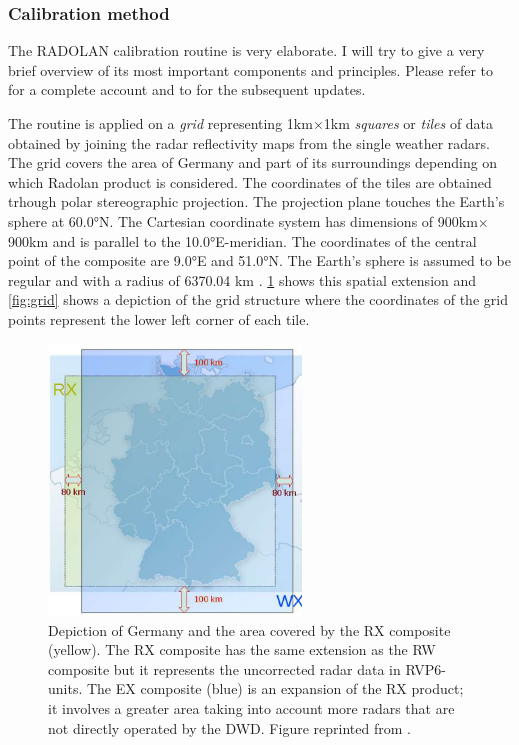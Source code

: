 \subsubsection{Calibration method}
The RADOLAN calibration routine is very elaborate. I will try to give a very brief overview of its most important components and principles. Please refer to \citet{Weigl2004ProjektOmbrometer} for a complete account and to \citet{Weigl2021RADOLANRoutine} for the subsequent updates.

The routine is applied on a \textit{grid} representing 1km$\times$1km \textit{squares} or \textit{tiles} of data obtained by joining the radar reflectivity maps from the single weather radars. The grid covers the area of Germany and part of its surroundings depending on which Radolan product is considered. The coordinates of the tiles are obtained trhough polar stereographic projection. The projection plane touches the Earth's sphere at 60.0°N. The Cartesian coordinate system has dimensions of 900km$\times$900km and is parallel to the 10.0°E-meridian. The coordinates of the central point of the composite are 9.0°E and 51.0°N. The Earth's sphere is assumed to be regular and with a radius of 6370.04 km . \cref{fig:radolanextension} shows this spatial extension and \cref{fig:grid} shows a depiction of the grid structure where the coordinates of the grid points represent the lower left corner of each tile. 

\begin{figure}[h!]
    \centering
    \includegraphics[width=0.6\textwidth]{RadolanExtension.png}
    \caption{Depiction of Germany and the area covered by the RX composite (yellow). The RX composite has the same extension as the RW composite but it represents the uncorrected radar data in RVP6-units. The EX composite (blue) is an expansion of the RX product; it involves a greater area
     taking into account more radars that are not directly operated by the DWD. Figure reprinted from \citet{Weigl2021RADOLAN/RADVOR2.5.3}.}
    \label{fig:radolanextension}
\end{figure}

